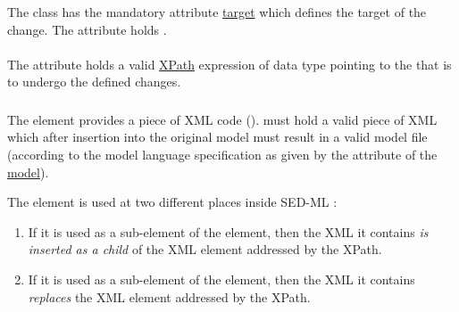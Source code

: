 The  class has the mandatory attribute \hyperref[sec:changeTarget]{target} which defines the target of the change. The \hyperref[sec:changeTarget]{} attribute holds  .



\paragraph*{}
\label{sec:changeTarget}
The  attribute holds  a valid \hyperref[sec:xpath]{XPath} expression of data type \hyperref[type:xpath]{} pointing to the  that is to undergo the defined changes.


\subsubsection{}
\label{sec:newXml}
The  element provides a piece of XML code ().  must hold a valid piece of XML  which after insertion into the original model must result in a valid model file (according to the model language specification as given by the \hyperref[sec:language]{} attribute of the \hyperref[class:model]{model}).

The  element is used at two different places inside SED-ML \currentLV:

\begin{enumerate}
	\item{If it is used as a sub-element of the \hyperref[class:addXml]{} element, then the XML it contains \emph{is inserted as a child} of the XML element addressed by the XPath.}
	\item{If it is used as a sub-element of the \hyperref[class:changeXml]{} element, then the XML it contains \emph{replaces} the XML element  addressed by the XPath.}
\end{enumerate}

